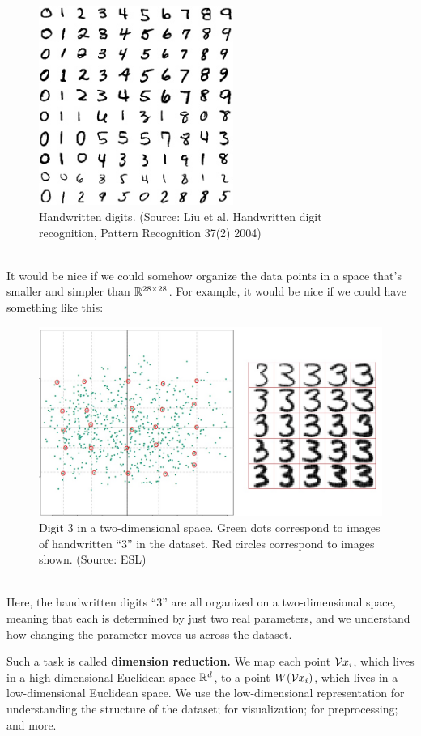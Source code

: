\begin{enumerate}
\begin{figure}[H]
      \centering
      \includegraphics[width=2.5in]{digits.jpg}  
          \caption{Handwritten digits. (Source: Liu et al, Handwritten digit recognition, Pattern
          Recognition 37(2) 2004)}
    \end{figure}
~\\
It would be nice if we could somehow organize the data points in a space that's
smaller and simpler than $\mathbb{R}^{28\times 28}$. For example, it would be nice if we could
have something like this:
%
\begin{figure}[H]
      \centering
      \includegraphics[width=5in]{digit3_pca.jpeg}  
      \caption{Digit 3 in a two-dimensional space. Green dots correspond to
        images of handwritten ``3'' in the dataset. 
        Red circles correspond to
      images shown. (Source: ESL)}
    \end{figure}
~\\
Here,  the handwritten digits ``3'' are all organized on a two-dimensional
    space, meaning that each is determined by just two real parameters, and we
    understand how changing the parameter moves us across the dataset.

    Such a task is called {\bf dimension reduction.} We map each point
    $\mathcal{V}{x}_i$, which lives in a high-dimensional Euclidean space $\mathbb{R}^d$, to a
    point $W(\mathcal{V}{x}_i)$, which lives in a low-dimensional Euclidean space. 
    We use the low-dimensional representation for understanding the structure of
    the dataset; for visualization; for preprocessing; and more.





\end{enumerate}
